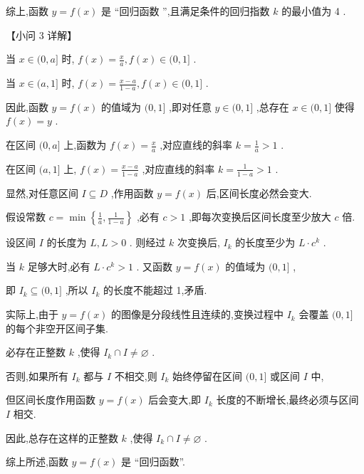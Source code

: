 \documentclass[10pt]{article}
\begin{document}
综上,函数 \(y = f\left( x\right)\) 是 “回归函数 ”,且满足条件的回归指数 \(k\) 的最小值为 4 .

【小问 3 详解】

当 \(x \in  (0,a\rbrack\) 时, \(f\left( x\right)  = \frac{x}{a},f\left( x\right)  \in  (0,1\rbrack\) .

当 \(x \in  (a,1\rbrack\) 时, \(f\left( x\right)  = \frac{x - a}{1 - a},f\left( x\right)  \in  (0,1\rbrack\) .

因此,函数 \(y = f\left( x\right)\) 的值域为 \((0,1\rbrack\) ,即对任意 \(y \in  (0,1\rbrack\) ,总存在 \(x \in  (0,1\rbrack\) 使得 \(f\left( x\right)  = y\) .

在区间 \((0,a\rbrack\) 上,函数为 \(f\left( x\right)  = \frac{x}{a}\) ,对应直线的斜率 \(k = \frac{1}{a} > 1\) .

在区间 \((a,1\rbrack\) 上, \(f\left( x\right)  = \frac{x - a}{1 - a}\) ,对应直线的斜率 \(k = \frac{1}{1 - a} > 1\) .

显然,对任意区间 \(I \subseteq  D\) ,作用函数 \(y = f\left( x\right)\) 后,区间长度必然会变大.

假设常数 \(c = \min \left\{  {\frac{1}{a},\frac{1}{1 - a}}\right\}\) ,必有 \(c > 1\) ,即每次变换后区间长度至少放大 \(c\) 倍.

设区间 \(I\) 的长度为 \(L,L > 0\) . 则经过 \(k\) 次变换后, \({I}_{k}\) 的长度至少为 \(L \cdot  {c}^{k}\) .

当 \(k\) 足够大时,必有 \(L \cdot  {c}^{k} > 1\) . 又函数 \(y = f\left( x\right)\) 的值域为 \((0,1\rbrack\) ,

即 \({I}_{k} \subseteq  (0,1\rbrack\) ,所以 \({I}_{k}\) 的长度不能超过 1,矛盾.

实际上,由于 \(y = f\left( x\right)\) 的图像是分段线性且连续的,变换过程中 \({I}_{k}\) 会覆盖 \((0,1\rbrack\) 的每个非空开区间子集.

必存在正整数 \(k\) ,使得 \({I}_{k} \cap  I \neq  \varnothing\) .

否则,如果所有 \({I}_{k}\) 都与 \(I\) 不相交,则 \({I}_{k}\) 始终停留在区间 \((0,1\rbrack\) 或区间 \(I\) 中,

但区间长度作用函数 \(y = f\left( x\right)\) 后会变大,即 \({I}_{k}\) 长度的不断增长,最终必须与区间 \(I\) 相交.

因此,总存在这样的正整数 \(k\) ,使得 \({I}_{k} \cap  I \neq  \varnothing\) .

综上所述,函数 \(y = f\left( x\right)\) 是 “回归函数”.
\end{document}
